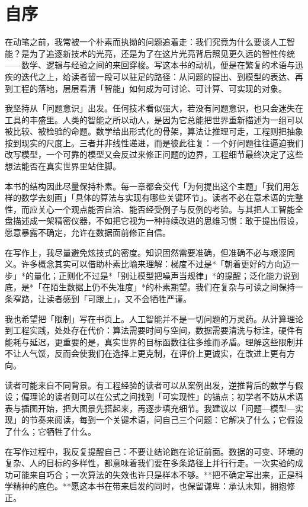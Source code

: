 \chapter*{自序}

在动笔之前，我常被一个朴素而执拗的问题追着走：我们究竟为什么要谈人工智能？是为了追逐新技术的光亮，还是为了在这片光亮背后照见更久远的智性传统——数学、逻辑与经验之间的来回穿梭。写这本书的动机，便是在繁复的术语与迅疾的迭代之上，给读者留一段可以驻足的路径：从问题的提出、到模型的表达、再到工程的落地，层层看清「智能」如何成为可讨论、可计算、可实现的对象。

我坚持从「问题意识」出发。任何技术看似强大，若没有问题意识，也只会迷失在工具的丰盛里。人类的智能之所以动人，是因为它总能把世界重新描述为一组可以被比较、被检验的命题。数学给出形式化的骨架，算法让推理可走，工程则把抽象按到现实的尺度上。三者并非线性递进，而是彼此往复：一个好问题往往逼迫我们改写模型，一个可靠的模型又会反过来修正问题的边界，工程细节最终决定了这些想法能否在真实世界里站住脚。

本书的结构因此尽量保持朴素。每一章都会交代「为何提出这个主题」「我们用怎样的数学去刻画」「具体的算法与实现有哪些关键环节」。读者不必在意术语的完整性，而应关心一个观点能否自洽、能否经受例子与反例的考验。与其把人工智能全盘描述成一架精密仪器，不如把它视为一种持续改进的思维习惯：敢于提出假设，愿意暴露不确定，允许在数据面前修正自信。

在写作上，我尽量避免炫技式的密度。知识固然需要准确，但准确不必与艰涩同义。许多概念其实可以借助朴素比喻来理解：梯度不过是*「朝着更好的方向迈一步」*的量化；正则化不过是*「别让模型把噪声当规律」*的提醒；泛化能力说到底，是*「在陌生数据上仍不失准度」*的朴素期望。我们在复杂与可读之间保持一条窄路，让读者感到「可跟上」，又不会牺牲严谨。

我也希望把「限制」写在书页上。人工智能并不是一切问题的万灵药。从计算理论到工程实践，处处存在代价：算法需要时间与空间，数据需要清洗与标注，硬件有能耗与延迟，更重要的是，真实世界的目标函数往往多维而矛盾。理解这些限制并不让人气馁，反而会使我们在选择上更克制，在评价上更诚实，在改进上更有方向。

读者可能来自不同背景。有工程经验的读者可以从案例出发，逆推背后的数学与假设；偏理论的读者则可以在公式之间找到「可实现性」的锚点；初学者不妨从术语表与插图开始，把大图景先搭起来，再逐步填充细节。我建议以「问题—模型—实现」的节奏来阅读，每到一个关键术语，问自己三个问题：它解决了什么；它假设了什么；它牺牲了什么。

在写作过程中，我反复提醒自己：不要让结论跑在论证前面。数据的可变、环境的复杂、人的目标的多样性，都意味着我们要在多条路径上并行行走。一次实验的成功可能来自巧合；一次算法的失效也许只是样本不够。**把不确定写出来，正是科学精神的底色。**愿这本书在带来启发的同时，也保留谦卑：承认未知，拥抱修正。

